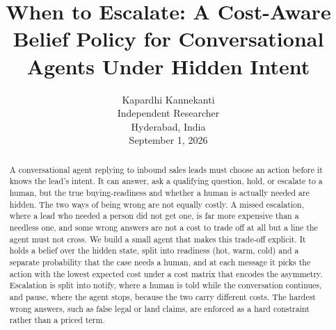 \documentclass{article}
\title{When to Escalate: A Cost-Aware Belief Policy for Conversational Agents
Under Hidden Intent}
\author{
Kapardhi Kannekanti \\
Independent Researcher \\
Hyderabad, India \\
\vspace{4pt}
September 1, 2026
}
\date{}
\begin{document}
\maketitle

\begin{abstract}
A conversational agent replying to inbound sales leads must choose an action
before it knows the lead's intent. It can answer, ask a qualifying question,
hold, or escalate to a human, but the true buying-readiness and whether a human
is actually needed are hidden. The two ways of being wrong are not equally
costly. A missed escalation, where a lead who needed a person did not get one,
is far more expensive than a needless one, and some wrong answers are not a cost
to trade off at all but a line the agent must not cross. We build a small agent
that makes this trade-off explicit. It holds a belief over the hidden state,
split into readiness (hot, warm, cold) and a separate probability that the case
needs a human, and at each message it picks the action with the lowest expected
cost under a cost matrix that encodes the asymmetry. Escalation is split into
notify, where a human is told while the conversation continues, and pause, where
the agent stops, because the two carry different costs. The hardest wrong
answers, such as false legal or land claims, are enforced as a hard constraint
rather than a priced term.


\end{abstract}
\end{document}
